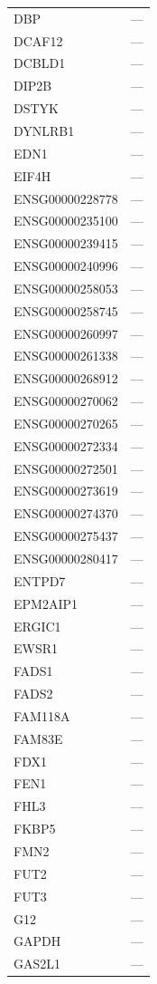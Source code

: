 \begin{longtable}{ll}
  DBP & --- \\
  DCAF12 & --- \\
  DCBLD1 & --- \\
  DIP2B & --- \\
  DSTYK & --- \\
  DYNLRB1 & --- \\
  EDN1 & --- \\
  EIF4H & --- \\
  ENSG00000228778 & --- \\
  ENSG00000235100 & --- \\
  ENSG00000239415 & --- \\
  ENSG00000240996 & --- \\
  ENSG00000258053 & --- \\
  ENSG00000258745 & --- \\
  ENSG00000260997 & --- \\
  ENSG00000261338 & --- \\
  ENSG00000268912 & --- \\
  ENSG00000270062 & --- \\
  ENSG00000270265 & --- \\
  ENSG00000272334 & --- \\
  ENSG00000272501 & --- \\
  ENSG00000273619 & --- \\
  ENSG00000274370 & --- \\
  ENSG00000275437 & --- \\
  ENSG00000280417 & --- \\
  ENTPD7 & --- \\
  EPM2AIP1 & --- \\
  ERGIC1 & --- \\
  EWSR1 & --- \\
  FADS1 & --- \\
  FADS2 & --- \\
  FAM118A & --- \\
  FAM83E & --- \\
  FDX1 & --- \\
  FEN1 & --- \\
  FHL3 & --- \\
  FKBP5 & --- \\
  FMN2 & --- \\
  FUT2 & --- \\
  FUT3 & --- \\
  G12 & --- \\
  GAPDH & --- \\
  GAS2L1 & --- \\

\end{longtable}
